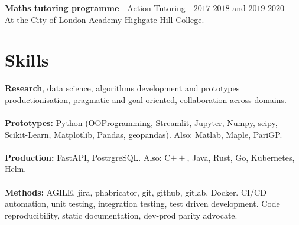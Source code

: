 \documentclass[margin,line]{resume}
\begin{document}
\begin{resume}
{\bf Maths tutoring programme} -  \href{https://actiontutoring.org.uk/}{Action Tutoring} - $2017$-$2018$ and $2019$-$2020$ \\
At the City of London Academy Highgate Hill College. 

\section{\mysidestyle Skills}
{\bf Research}, data science, algorithms development and prototypes productionisation, pragmatic and goal oriented, collaboration across domains. \\ \\ 
\textbf{Prototypes:} Python (OOProgramming, Streamlit, Jupyter, Numpy, scipy, Scikit-Learn, Matplotlib, Pandas, geopandas). Also: Matlab, Maple, PariGP.\\ \\
\textbf{Production:} FastAPI, PostrgreSQL. Also: C$++$, Java, Rust, Go, Kubernetes, Helm. \\ \\
\textbf{Methods:} AGILE, jira, phabricator, git, github, gitlab, Docker. CI/CD automation, unit testing, integration testing, test driven development. Code reproducibility, static documentation, dev-prod parity advocate.\\ \\ 

\end{resume}
\end{document}
